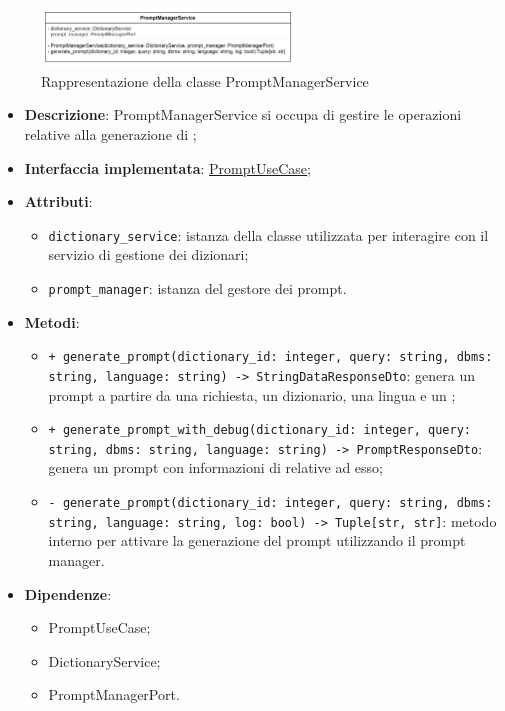  \label{PromptManagementService}
\begin{figure}[H]
    \centering
    \includegraphics[width=0.6\textwidth]{assets/Backend/prompt_manager_service.png}
    \caption{Rappresentazione della classe PromptManagerService}
  \end{figure}
\begin{itemize}
    \item \textbf{Descrizione}: PromptManagerService si occupa di gestire le operazioni relative alla generazione di ;
    \item \textbf{Interfaccia implementata}: \hyperref[PromptUseCase]{PromptUseCase};
    \item \textbf{Attributi}:
    \begin{itemize}
        \item \texttt{dictionary\_service}: istanza della classe utilizzata per interagire con il servizio di gestione dei dizionari;
        \item \texttt{prompt\_manager}: istanza del gestore dei prompt.
    \end{itemize}
    \item \textbf{Metodi}:
    \begin{itemize}
        \item \texttt{+ generate\_prompt(dictionary\_id: integer, query: string, dbms: string, language: string) -> StringDataResponseDto}: genera un prompt a partire da una richiesta, un dizionario, una lingua e un ;
        \item \texttt{+ generate\_prompt\_with\_debug(dictionary\_id: integer, query: string, dbms: string, language: string) -> PromptResponseDto}: genera un prompt con informazioni di  relative ad esso;
        \item \texttt{- generate\_prompt(dictionary\_id: integer, query: string, dbms: string, language: string, log: bool) -> Tuple[str, str]}: metodo interno per attivare la generazione del prompt utilizzando il prompt manager.
    \end{itemize}
    \item \textbf{Dipendenze}:
    \begin{itemize}
        \item PromptUseCase;
        \item DictionaryService;
        \item PromptManagerPort.
    \end{itemize}
\end{itemize}  